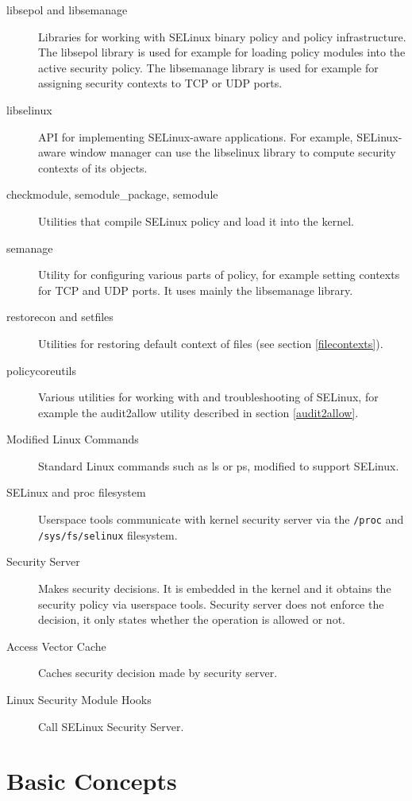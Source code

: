 \begin{description}
    \item [libsepol and libsemanage] Libraries for working with SELinux binary
        policy and policy infrastructure. The libsepol library is used for
        example for loading policy modules into the active security policy. The
        libsemanage library is used for example for assigning security contexts
        to TCP or UDP ports.
    \item [libselinux] API for implementing SELinux-aware applications. For
        example, SELinux-aware window manager can use the libselinux library to
        compute security contexts of its objects.
    \item [checkmodule, semodule\_package, semodule] Utilities that compile
        SELinux policy and load it into the kernel.
    \item [semanage] Utility for configuring various parts of policy, for
        example setting contexts for TCP and UDP ports. It uses mainly the
        libsemanage library.
    \item [restorecon and setfiles] Utilities for restoring default context of
        files (see section \ref{filecontexts}).
    \item [policycoreutils] Various utilities for working with and
        troubleshooting of SELinux, for example the audit2allow utility
        described in section \ref{audit2allow}.
    \item [Modified Linux Commands] Standard Linux commands such as ls or ps,
        modified to support SELinux.
    \item [SELinux and proc filesystem] Userspace tools communicate with kernel
        security server via the \texttt{/proc} and \texttt{/sys/fs/selinux}
        filesystem.
    \item [Security Server] Makes security decisions. It is embedded in the
        kernel and it obtains the security policy via userspace tools. Security
        server does not enforce the decision, it only states whether the
        operation is allowed or not.
    \item [Access Vector Cache] Caches security decision made by security
        server.
    \item [Linux Security Module Hooks] Call SELinux Security Server.
\end{description}

\section{Basic Concepts}


